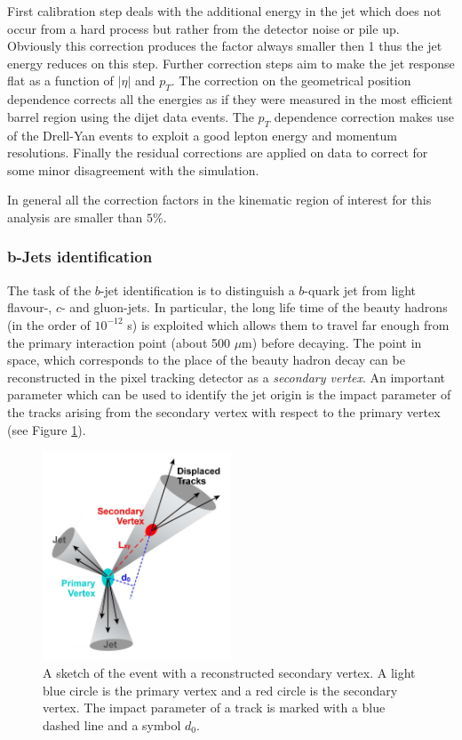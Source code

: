 First calibration step deals with the additional energy in the jet which does not occur from a hard process but rather from the detector noise or pile up. 
Obviously this correction produces the factor always smaller then 1 thus the jet energy reduces on this step. Further correction steps aim to make the jet response
flat as a function of $|\eta|$ and $p_{T}$. The correction on the geometrical position dependence corrects all the energies as if they were measured 
in the most efficient barrel region using the dijet data events. The $p_{T}$ dependence correction makes use of the Drell-Yan events to exploit a good
lepton energy and momentum resolutions. Finally the residual corrections are applied on data to correct for some minor disagreement with the simulation.

In general all the correction factors in the kinematic region of interest for this analysis are smaller than $5\%$.

\subsubsection{b-Jets identification}\label{ssec:bTag}

The task of the $b$-jet identification is to distinguish a $b$-quark jet from light flavour-, $c$- and gluon-jets. In particular,
the long life time of the beauty hadrons (in the order of $10^{-12}$ s) is exploited which allows them to travel far enough from the primary interaction point 
(about 500 $\mu$m) before decaying. The point in space, which corresponds to the place of the beauty hadron decay can be reconstructed in the pixel tracking 
detector as a \textit{secondary vertex}. An important parameter which can be used to identify the jet origin is the impact parameter of the tracks arising 
from the secondary vertex with respect to the primary vertex (see Figure \ref{fig:SV}).

\begin{figure}[t]
  \centering
  \includegraphics[width=0.5\textwidth]{04_event_reconstruction/plots/btagging_cartoon.png}
  \caption{A sketch of the event with a reconstructed secondary vertex. A light blue circle is the primary vertex and a red circle is the secondary vertex. The impact 
  parameter of a track is marked with a blue dashed line and a symbol $d_{0}$.}
  \label{fig:SV}
\end{figure}

